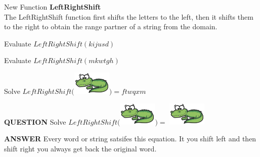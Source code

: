\documentclass{ximera}
\begin{document}
\begin{exploration}
New Function \textbf{LeftRightShift}\\
The LeftRightShift function first shifts the letters to the left, then it shifts them to the right to obtain the range partner of a string from the domain.
\quad \\


\begin{question}
Evaluate $LeftRightShift(kijusd)$
\begin{multipleChoice}
\end{multipleChoice}
\end{question}





\begin{question}
Evaluate $LeftRightShift(mkwtgh)$
\begin{multipleChoice}
\end{multipleChoice}
\end{question}




\begin{question}
Solve $LeftRightShift($\includegraphics{pics/alligator.png}$) = ftwqxm$
\begin{multipleChoice}
\end{multipleChoice}
\end{question}





\begin{dialogue}
\item[\textbf{QUESTION}] Solve $LeftRightShift($\includegraphics{pics/alligator.png}$ ) = $ \includegraphics{pics/alligator.png}
\item[\textbf{ANSWER}] Every word or string satsifes this equation.  It you shift left and then shift right you always get back the original word.
\end{dialogue}

\end{exploration}
\end{document}
